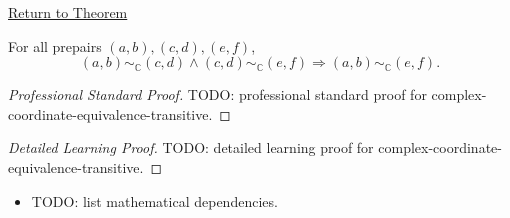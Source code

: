 \newpage
{}
\label{prf:complex-coordinate-equivalence-transitive}

\begin{remark*}[Return]
\hyperref[lem:complex-coordinate-equivalence-transitive]{Return to Theorem}
\end{remark*}

\begin{lemma*}
For all prepairs $(a,b),(c,d),(e,f)$,
\[
(a,b)\sim_{\mathbb{C}}(c,d)\land
(c,d)\sim_{\mathbb{C}}(e,f)
\Longrightarrow
(a,b)\sim_{\mathbb{C}}(e,f).
\]
\end{lemma*}

\begin{proof}[Professional Standard Proof]
\LRAProofBodyStart
TODO: professional standard proof for complex-coordinate-equivalence-transitive.
\end{proof}

\begin{proof}[Detailed Learning Proof]
\LRAProofBodyStart
TODO: detailed learning proof for complex-coordinate-equivalence-transitive.
\end{proof}

\begin{remark*}
\end{remark*}

\begin{dependencies}
\begin{itemize}
  \item TODO: list mathematical dependencies.
\end{itemize}
\end{dependencies}

\clearpage
